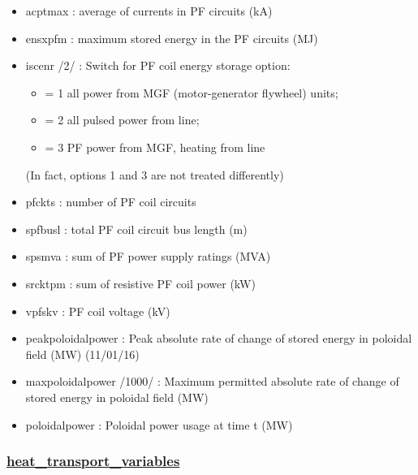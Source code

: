 \documentclass[]{article}
\providecommand{\tightlist}{%
  \setlength{\itemsep}{0pt}\setlength{\parskip}{0pt}}
\begin{document}
\begin{itemize}
\tightlist
\item
  acptmax : average of currents in PF circuits (kA)
\item
  ensxpfm : maximum stored energy in the PF circuits (MJ)
\item
  iscenr /2/ : Switch for PF coil energy storage option:

  \begin{itemize}
  \tightlist
  \item
    = 1 all power from MGF (motor-generator flywheel) units;
  \item
    = 2 all pulsed power from line;
  \item
    = 3 PF power from MGF, heating from line
  \end{itemize}

  (In fact, options 1 and 3 are not treated differently)
\item
  pfckts : number of PF coil circuits
\item
  spfbusl : total PF coil circuit bus length (m)
\item
  spsmva : sum of PF power supply ratings (MVA)
\item
  srcktpm : sum of resistive PF coil power (kW)
\item
  vpfskv : PF coil voltage (kV)
\item
  peakpoloidalpower : Peak absolute rate of change of stored energy in
  poloidal field (MW) (11/01/16)
\item
  maxpoloidalpower /1000/ : Maximum permitted absolute rate of change of
  stored energy in poloidal field (MW)
\item
  poloidalpower : Poloidal power usage at time t (MW)
\end{itemize}

\subsubsection{\texorpdfstring{\href{heat_transport_variables.html}{heat\_transport\_variables}}{heat\_transport\_variables}}\label{heat_transport_variables}
\end{document}
